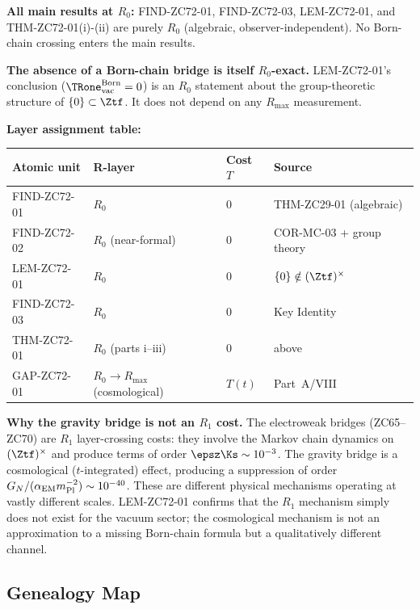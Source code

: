 \documentclass[12pt, a4paper]{article}
\begin{document}
\begin{layerbox}[title={R-Layer Assignments for ZC72}]

\textbf{All main results at $R_0$:}
FIND-ZC72-01, FIND-ZC72-03, LEM-ZC72-01, and THM-ZC72-01(i)-(ii)
are purely $R_0$ (algebraic, observer-independent).
No Born-chain crossing enters the main results.

\textbf{The absence of a Born-chain bridge is itself $R_0$-exact.}
LEM-ZC72-01's conclusion ($\TRone_{\rm vac}^{\rm Born} = 0$)
is an $R_0$ statement about the group-theoretic structure of
$\{0\} \subset \Ztf$. It does not depend on any $R_{\max}$
measurement.

\textbf{Layer assignment table:}
\begin{center}
{\small\renewcommand{\arraystretch}{1.25}
\begin{tabular}{@{}llll@{}}
\toprule
Atomic unit & R-layer & Cost $T$ & Source \\
\midrule
FIND-ZC72-01 & $R_0$ & $0$ & THM-ZC29-01 (algebraic) \\
FIND-ZC72-02 & $R_0$ (near-formal) & $0$ & COR-MC-03 + group theory \\
LEM-ZC72-01 & $R_0$ & $0$ & $\{0\} \notin (\Ztf)^\times$ \\
FIND-ZC72-03 & $R_0$ & $0$ & Key Identity \\
THM-ZC72-01 & $R_0$ (parts i--iii) & $0$ & above \\
GAP-ZC72-01 & $R_0 \to R_{\max}$ (cosmological) & $T(t)$ & Part~A/VIII \\
\bottomrule
\end{tabular}
}
\end{center}

\textbf{Why the gravity bridge is not an $R_1$ cost.}
The electroweak bridges (ZC65--ZC70) are $R_1$ layer-crossing
costs: they involve the Markov chain dynamics on $(\Ztf)^\times$
and produce terms of order $\epsz\Ks \sim 10^{-3}$.
The gravity bridge is a cosmological ($t$-integrated) effect,
producing a suppression of order $G_N/(\alpha_{\rm EM} m_{\rm Pl}^{-2})
\sim 10^{-40}$. These are different physical mechanisms operating
at vastly different scales. LEM-ZC72-01 confirms that the
$R_1$ mechanism simply does not exist for the vacuum sector;
the cosmological mechanism is not an approximation to a missing
Born-chain formula but a qualitatively different channel.
\end{layerbox}

\subsection{Genealogy Map}
\label{sec:genealogy}
\end{document}
